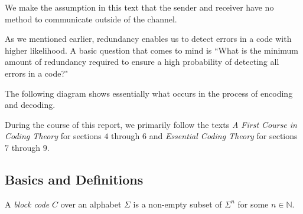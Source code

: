 \vspace{2mm}
We make the assumption in this text that the sender and receiver have no method to communicate outside of the channel.

\vspace{2mm}
As we mentioned earlier, redundancy enables us to detect errors in a code with higher likelihood. A basic question that comes to mind is ``What is the minimum amount of redundancy required to ensure a high probability of detecting all errors in a code?"

\vspace{2mm}
The following diagram shows essentially what occurs in the process of encoding and decoding.

\begin{center}
\end{center}

During the course of this report, we primarily follow the texts \textit{A First Course in Coding Theory} \cite{hill} for sections $4$ through $6$ and \textit{Essential Coding Theory} \cite{esse} for sections $7$ through $9$.

\subsection{Basics and Definitions}

\begin{definition}
    A \textit{block code} $C$ over an alphabet $\Sigma$ is a non-empty subset of $\Sigma^n$ for some $n\in\mathbb{N}$.
\end{definition}

